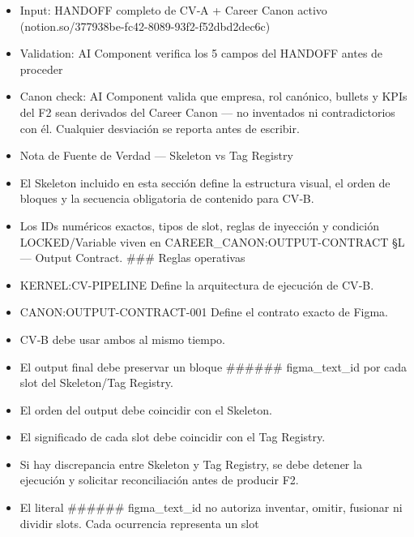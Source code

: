 \documentclass[
]{article}
\begin{document}
\begin{itemize}
  Orden canónico obligatorio: C01 → C02 → C03 → C04 → C05

  Regla de Entrega de Markdown con Figma Tags CV‑B entrega el Markdown
  con Figma tags al operador antes de escribir en Notion. El operador
  revisa y autoriza. Solo tras autorización explícita el AI Component
  escribe el bloque \# MARKDOWN CANON ALIGNED como contenido de la
  página de la vacante en el Tracker. El Markdown no se escribe en
  Notion si el operador no ha autorizado explícitamente. \#\#\# CV‑B
\item
  Input: HANDOFF completo de CV‑A + Career Canon activo
  (notion.so/377938be-fc42-8089-93f2-f52dbd2dec6c)
\item
  Validation: AI Component verifica los 5 campos del HANDOFF antes de
  proceder
\item
  Canon check: AI Component valida que empresa, rol canónico, bullets y
  KPIs del F2 sean derivados del Career Canon --- no inventados ni
  contradictorios con él. Cualquier desviación se reporta antes de
  escribir.
\item
  Nota de Fuente de Verdad --- Skeleton vs Tag Registry
\item
  El Skeleton incluido en esta sección define la estructura visual, el
  orden de bloques y la secuencia obligatoria de contenido para CV‑B.
\item
  Los IDs numéricos exactos, tipos de slot, reglas de inyección y
  condición LOCKED/Variable viven en CAREER\_CANON:OUTPUT-CONTRACT §L
  --- Output Contract. \#\#\# Reglas operativas
\item
  KERNEL:CV-PIPELINE Define la arquitectura de ejecución de CV‑B.
\item
  CANON:OUTPUT-CONTRACT-001 Define el contrato exacto de Figma.
\item
  CV‑B debe usar ambos al mismo tiempo.
\item
  El output final debe preservar un bloque \#\#\#\#\#\# figma\_text\_id
  por cada slot del Skeleton/Tag Registry.
\item
  El orden del output debe coincidir con el Skeleton.
\item
  El significado de cada slot debe coincidir con el Tag Registry.
\item
  Si hay discrepancia entre Skeleton y Tag Registry, se debe detener la
  ejecución y solicitar reconciliación antes de producir F2.
\item
  El literal \#\#\#\#\#\# figma\_text\_id no autoriza inventar, omitir,
  fusionar ni dividir slots. Cada ocurrencia representa un slot

\end{itemize}
\end{document}

